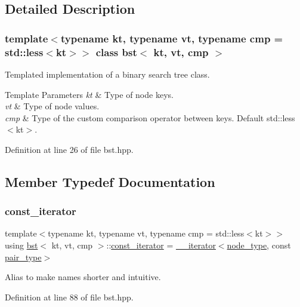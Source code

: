 \subsection{Detailed Description}
\subsubsection*{template$<$typename kt, typename vt, typename cmp = std\+::less$<$kt$>$$>$\newline
class bst$<$ kt, vt, cmp $>$}

Templated implementation of a binary search tree class. 


\begin{DoxyTemplParams}{Template Parameters}
{\em kt} & Type of node keys. \\
\hline
{\em vt} & Type of node values. \\
\hline
{\em cmp} & Type of the custom comparison operator between keys. Default std\+::less$<$kt$>$. \\
\hline
\end{DoxyTemplParams}


Definition at line 26 of file bst.\+hpp.



\subsection{Member Typedef Documentation}
\mbox{\label{classbst_a72485696d999bf489c6156f6327a2163}} 
\subsubsection{\texorpdfstring{const\+\_\+iterator}{const\_iterator}}
{\footnotesize\ttfamily template$<$typename kt, typename vt, typename cmp = std\+::less$<$kt$>$$>$ \\
using \hyperlink{classbst}{bst}$<$ kt, vt, cmp $>$\+::\hyperlink{classbst_a72485696d999bf489c6156f6327a2163}{const\+\_\+iterator} =  \hyperlink{classbst_1_1____iterator}{\+\_\+\+\_\+iterator}$<$\hyperlink{classbst_a062eb2a1ac54802dbc4f0f74ae2afd01}{node\+\_\+type}, const \hyperlink{classbst_a7b11cca2a3b4394915600194f741ab16}{pair\+\_\+type}$>$}

Alias to make names shorter and intuitive. 

Definition at line 88 of file bst.\+hpp.

